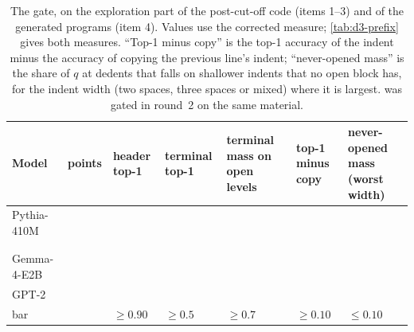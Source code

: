 \begin{table}[H]
\centering\small
\caption{The gate, on the exploration part of the post-cut-off code (items 1--3) and of the generated programs (item 4). Values use the corrected measure; \cref{tab:d3-prefix} gives both measures. ``Top-1 minus copy'' is the top-1 accuracy of the indent minus the accuracy of copying the previous line's indent; ``never-opened mass'' is the share of $q$ at dedents that falls on shallower indents that no open block has, for the indent width (two spaces, three spaces or mixed) where it is largest. \olmo{} was gated in round~2 on the same material.}
\label{tab:d3-gate}
\begin{tabularx}{\linewidth}{@{}lYYYYYY@{}}
\toprule
Model & points & header top-1 & terminal top-1 & terminal mass on open levels & top-1 minus copy & never-opened mass (worst width) \\
\midrule
Pythia-410M &  &  &  &  &  &  \\
\qsix{} &  &  &  &  &  &  \\
\olmo{} &  &  &  &  &  &  \\
Gemma-4-E2B &  &  &  &  &  &  \\
GPT-2 &  &  &  &  &  &  \\
\midrule
bar & & $\geq 0.90$ & $\geq 0.5$ & $\geq 0.7$ & $\geq 0.10$ & $\leq 0.10$ \\
\bottomrule
\end{tabularx}
\end{table}
